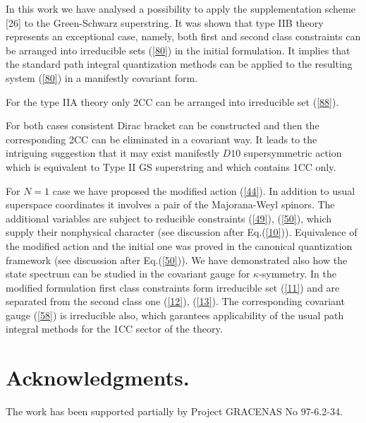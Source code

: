\documentclass[a4paper]{article}
\begin{document}
In this work we have analysed a possibility to apply the 
supplementation scheme [26] to the Green-Schwarz superstring. It was 
shown that type IIB theory represents an exceptional case, namely, 
both first and second class constraints can be arranged into irreducible 
sets (\ref{80}) in the initial formulation. It implies that the standard 
path integral quantization methods can be applied to the resulting 
system (\ref{80}) in a manifestly covariant form. 

For the type IIA theory only 2CC can be arranged into irreducible 
set (\ref{88}).

For both cases consistent Dirac bracket can be constructed and then the 
corresponding 2CC can be eliminated in a covariant way. It leads to 
the intriguing suggestion that it may exist manifestly $D10$ 
supersymmetric action which is equivalent to Type II GS superstring and 
which contains 1CC only. 

For $N=1$ case we have proposed the modified action (\ref{44}). 
In addition to usual superspace coordinates it involves a 
pair of the Majorana-Weyl spinors. The additional variables are subject 
to reducible constraints (\ref{49}), (\ref{50}), which supply their 
nonphysical character (see discussion after Eq.(\ref{10})). Equivalence 
of the modified action and the initial one was proved in the canonical 
quantization framework (see discussion after Eq.(\ref{50})). We have 
demonstrated also how the state spectrum can be studied in the covariant 
gauge for $\kappa$-symmetry.
In the modified formulation first class constraints form irreducible set 
(\ref{11}) and are separated from the second class one (\ref{12}), 
(\ref{13}). The 
corresponding covariant gauge (\ref{58}) is irreducible also, which 
garantees applicability of the usual path integral methods for the 1CC 
sector of the theory. 

\section*{Acknowledgments.}

The work has been supported partially by Project GRACENAS No 97-6.2-34.
   
\end{document}
